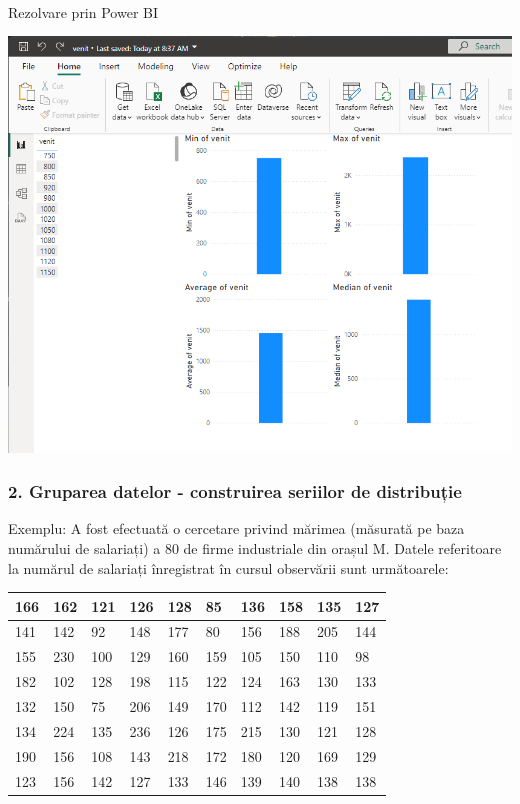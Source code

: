 \documentclass[
  11pt,
  b5paper,
  nottoc]{book}
\makeatletter
\let\oldparagraph\paragraph
\renewcommand{\paragraph}{
    \@ifstar
      \xxxParagraphStar
      \xxxParagraphNoStar
  }
\newcommand{\xxxParagraphStar}[1]{\oldparagraph*{#1}\mbox{}}
\newcommand{\xxxParagraphNoStar}[1]{\oldparagraph{#1}\mbox{}}
\makeatother
\begin{document}
\paragraph{Rezolvare prin Power BI}\label{rezolvare-prin-power-bi}

\includegraphics{date/medie_simpla_Pbi.png}

\subsubsection{2. Gruparea datelor - construirea seriilor de
distribuție}\label{gruparea-datelor---construirea-seriilor-de-distribuux21bie}

Exemplu: A fost efectuată o cercetare privind mărimea (măsurată pe baza
numărului de salariați) a 80 de firme industriale din orașul M. Datele
referitoare la numărul de salariați înregistrat în cursul observării
sunt următoarele:

\begin{table}[]
\begin{tabular}{|l|l|l|l|l|l|l|l|l|l|}
\hline
166 & 162 & 121 & 126 & 128 & 85  & 136 & 158 & 135 & 127 \\ \hline
141 & 142 & 92  & 148 & 177 & 80  & 156 & 188 & 205 & 144 \\ \hline
155 & 230 & 100 & 129 & 160 & 159 & 105 & 150 & 110 & 98  \\ \hline
182 & 102 & 128 & 198 & 115 & 122 & 124 & 163 & 130 & 133 \\ \hline
132 & 150 & 75  & 206 & 149 & 170 & 112 & 142 & 119 & 151 \\ \hline
134 & 224 & 135 & 236 & 126 & 175 & 215 & 130 & 121 & 128 \\ \hline
190 & 156 & 108 & 143 & 218 & 172 & 180 & 120 & 169 & 129 \\ \hline
123 & 156 & 142 & 127 & 133 & 146 & 139 & 140 & 138 & 138 \\ \hline
\end{tabular}
\end{table}
\end{document}
